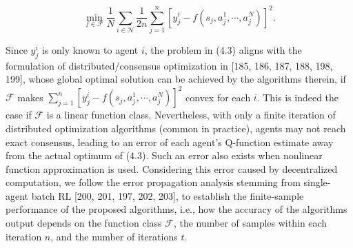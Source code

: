 \documentclass[10pt]{article}
\begin{document}
\[
\min _{f \in \mathcal{F}} \frac{1}{N} \sum_{i \in \mathcal{N}} \frac{1}{2 n} \sum_{j=1}^{n}\left[y_{j}^{i}-f\left(s_{j}, a_{j}^{1}, \cdots, a_{j}^{N}\right)\right]^{2} .
\]

Since $y_{j}^{i}$ is only known to agent $i$, the problem in (4.3) aligns with the formulation of distributed/consensus optimization in [185, 186, 187, 188, 198, 199], whose global optimal solution can be achieved by the algorithms therein, if $\mathcal{F}$ makes $\sum_{j=1}^{n}\left[y_{j}^{i}-f\left(s_{j}, a_{j}^{1}, \cdots, a_{j}^{N}\right)\right]^{2}$ convex for each $i$. This is indeed the case if $\mathcal{F}$ is a linear function class. Nevertheless, with only a finite iteration of distributed optimization algorithms (common in practice), agents may not reach exact consensus, leading to an error of each agent's Q-function estimate away from the actual optimum of (4.3). Such an error also exists when nonlinear function approximation is used. Considering this error caused by decentralized computation, we follow the error propagation analysis stemming from single-agent batch RL [200, 201, 197, 202, 203], to establish the finite-sample performance of the proposed algorithms, i.e., how the accuracy of the algorithms output depends on the function class $\mathcal{F}$, the number of samples within each iteration $n$, and the number of iterations $t$.
\end{document}
